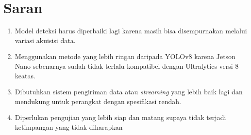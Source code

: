 \section{Saran}
\label{sec:sec4_saran}
\vspace{1ex}
\begin{enumerate}
    \item Model deteksi harus diperbaiki lagi karena masih bisa disempurnakan melalui variasi akuisisi data.
    \item Menggunakan metode yang lebih ringan daripada YOLOv8 karena Jetson Nano sebenarnya sudah tidak terlalu kompatibel dengan Ultralytics versi 8 keatas.
    \item Dibutuhkan sistem pengiriman data atau \emph{streaming} yang lebih baik lagi dan mendukung untuk perangkat dengan spesifikasi rendah.
    \item Diperlukan pengujian yang lebih siap dan matang supaya tidak terjadi ketimpangan yang tidak diharapkan
\end{enumerate}

